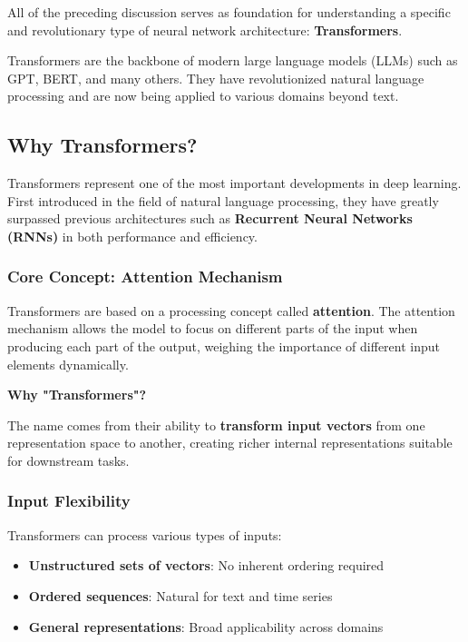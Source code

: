 \documentclass[11pt,a4paper]{article}
\theoremstyle{definition}
\theoremstyle{plain}
\theoremstyle{remark}
\begin{document}
\begin{tcolorbox}[colback=red!5!white,colframe=red!75!black,title=\textbf{Key Concept: Transformers}]
All of the preceding discussion serves as foundation for understanding a specific and revolutionary type of neural network architecture: \textbf{Transformers}.

Transformers are the backbone of modern large language models (LLMs) such as GPT, BERT, and many others. They have revolutionized natural language processing and are now being applied to various domains beyond text.
\end{tcolorbox}

\subsection{Why Transformers?}

Transformers represent one of the most important developments in deep learning. First introduced in the field of natural language processing, they have greatly surpassed previous architectures such as \textbf{Recurrent Neural Networks (RNNs)} in both performance and efficiency.

\subsubsection{Core Concept: Attention Mechanism}

\begin{tcolorbox}[colback=cyan!5!white,colframe=cyan!75!black,title=\textbf{The Attention Mechanism}]
Transformers are based on a processing concept called \textbf{attention}. The attention mechanism allows the model to focus on different parts of the input when producing each part of the output, weighing the importance of different input elements dynamically.
\end{tcolorbox}

\textbf{Why "Transformers"?}

The name comes from their ability to \textbf{transform input vectors} from one representation space to another, creating richer internal representations suitable for downstream tasks.

\subsubsection{Input Flexibility}

Transformers can process various types of inputs:
\begin{itemize}
    \item \textbf{Unstructured sets of vectors}: No inherent ordering required
    \item \textbf{Ordered sequences}: Natural for text and time series
    \item \textbf{General representations}: Broad applicability across domains
\end{itemize}
\end{document}
